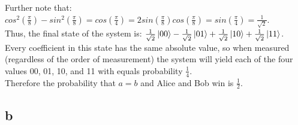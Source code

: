 \documentclass[letterpaper,notitlepage,twoside]{article}
\begin{document}
Further note that: $cos^{2}(\frac{\pi}{8}) - sin^{2}(\frac{\pi}{8}) = cos(\frac{\pi}{4}) = 2sin(\frac{\pi}{8})cos(\frac{\pi}{8}) = sin(\frac{\pi}{4}) = \frac{1}{\sqrt{2}}$. \\
Thus, the final state of the system is: $\frac{1}{\sqrt{2}} \ket{00} - \frac{1}{\sqrt{2}} \ket{01} + \frac{1}{\sqrt{2}} \ket{10} + \frac{1}{\sqrt{2}} \ket{11}$. \\
Every coefficient in this state has the same absolute value, so when measured (regardless of the order of measurement) the system will yield each of the four values 00, 01, 10, and 11 with equals probability $\frac{1}{4}$. \\
Therefore the probability that $a=b$ and Alice and Bob win is $\frac{1}{2}$.
\subsection*{b}
\end{document}
